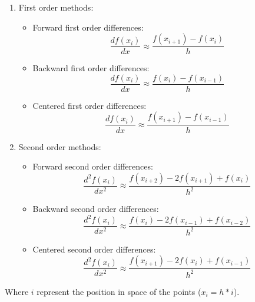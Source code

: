 \begin{enumerate}
    \item First order methods:
          \begin{itemize}
              \item Forward first order differences:
                    \begin{equation}
                        \frac{df(x_{i})}{dx} \approx \frac{f(x_{i+1}) - f(x_{i})}{h}
                    \end{equation}
              \item Backward first order differences:
                    \begin{equation}
                        \frac{df(x_{i})}{dx} \approx \frac{f(x_i) - f(x_{i-1})}{h}
                    \end{equation}
              \item Centered first order differences:
                    \begin{equation}
                        \frac{df(x_{i})}{dx} \approx \frac{f(x_{i+1}) - f(x_{i-1})}{h}
                    \end{equation}
          \end{itemize}

    \item Second order methods:
          \begin{itemize}
              \item Forward second order differences:
                    \begin{equation}
                        \frac{d^{2} f(x_{i})}{dx^2} \approx \frac{f(x_{i+2}) - 2f(x_{i+1}) + f(x_i)}{h^2}
                    \end{equation}
              \item Backward second order differences:
                    \begin{equation}
                        \frac{d^{2} f(x_{i})}{dx^2} \approx \frac{f(x_i) - 2f(x_{i-1}) + f(x_{i-2})}{h^2}
                    \end{equation}
              \item Centered second order differences:
                    \begin{equation}
                        \frac{d^{2} f(x_{i})}{dx^2} \approx \frac{f(x_{i+1}) - 2f(x_i) + f(x_{i-1})}{h^2}
                    \end{equation}
          \end{itemize}
\end{enumerate}
Where $i$ represent the position in space of the points ($x_{i} = h*i$).

